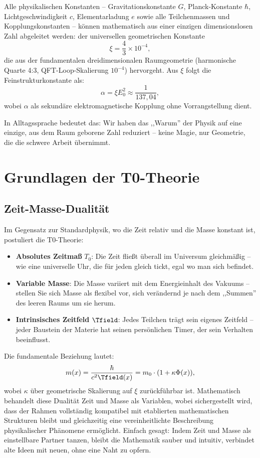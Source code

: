 	\begin{keyresult}
		Alle physikalischen Konstanten – Gravitationskonstante $G$, Planck-Konstante $\hbar$, Lichtgeschwindigkeit $c$, Elementarladung $e$ sowie alle Teilchenmassen und Kopplungskonstanten – können mathematisch aus einer einzigen dimensionslosen Zahl abgeleitet werden: der universellen geometrischen Konstante
		\[
		\xi = \frac{4}{3} \times 10^{-4},
		\]
		die aus der fundamentalen dreidimensionalen Raumgeometrie (harmonische Quarte 4:3, QFT-Loop-Skalierung $10^{-4}$) hervorgeht.
		Aus $\xi$ folgt die Feinstrukturkonstante als:
		\[
		\alpha = \xi E_0^2 \approx \frac{1}{137{,}04},
		\]
		wobei $\alpha$ als sekundäre elektromagnetische Kopplung ohne Vorrangstellung dient.
	\end{keyresult}
	
	In Alltagssprache bedeutet das: Wir haben das ,,Warum'' der Physik auf eine einzige, aus dem Raum geborene Zahl reduziert – keine Magie, nur Geometrie, die die schwere Arbeit übernimmt.
	
	\section{Grundlagen der T0-Theorie}
	
	\subsection{Zeit-Masse-Dualität}
	Im Gegensatz zur Standardphysik, wo die Zeit relativ und die Masse konstant ist, postuliert die T0-Theorie:
	\begin{itemize}
		\item \textbf{Absolutes Zeitmaß} $T_0$: Die Zeit fließt überall im Universum gleichmäßig – wie eine universelle Uhr, die für jeden gleich tickt, egal wo man sich befindet.
		\item \textbf{Variable Masse}: Die Masse variiert mit dem Energieinhalt des Vakuums – stellen Sie sich Masse als flexibel vor, sich verändernd je nach dem ,,Summen'' des leeren Raums um sie herum.
		\item \textbf{Intrinsisches Zeitfeld} $\Tfield$: Jedes Teilchen trägt sein eigenes Zeitfeld – jeder Baustein der Materie hat seinen persönlichen Timer, der sein Verhalten beeinflusst.
	\end{itemize}
	
	Die fundamentale Beziehung lautet:
	\[
	m(x) = \frac{\hbar}{c^2 \Tfield(x)} = m_0 \cdot (1 + \kappa \Phi(x)),
	\]
	wobei $\kappa$ über geometrische Skalierung auf $\xi$ zurückführbar ist. Mathematisch behandelt diese Dualität Zeit und Masse als Variablen, wobei sichergestellt wird, dass der Rahmen vollständig kompatibel mit etablierten mathematischen Strukturen bleibt und gleichzeitig eine vereinheitlichte Beschreibung physikalischer Phänomene ermöglicht. Einfach gesagt: Indem Zeit und Masse als einstellbare Partner tanzen, bleibt die Mathematik sauber und intuitiv, verbindet alte Ideen mit neuen, ohne eine Naht zu opfern.
	
